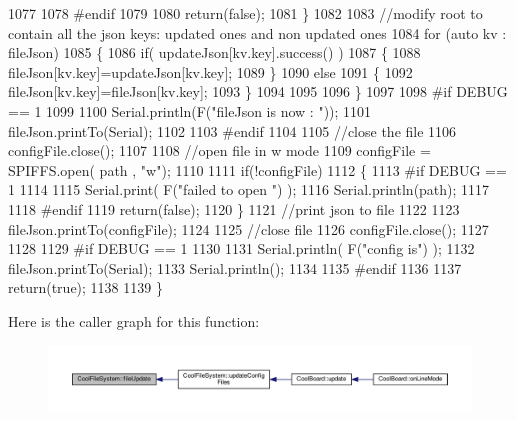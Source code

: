 \begin{DoxyCode}
1077 
1078 \textcolor{preprocessor}{    #endif}
1079 
1080         \textcolor{keywordflow}{return}(\textcolor{keyword}{false});
1081     \}
1082     
1083     \textcolor{comment}{//modify root to contain all the json keys: updated ones and non updated ones}
1084     \textcolor{keywordflow}{for} (\textcolor{keyword}{auto} kv : fileJson) 
1085     \{
1086         \textcolor{keywordflow}{if}( updateJson[kv.key].success() )
1087         \{
1088             fileJson[kv.key]=updateJson[kv.key];            
1089         \}
1090         \textcolor{keywordflow}{else}
1091         \{
1092             fileJson[kv.key]=fileJson[kv.key];
1093         \}
1094 
1095                 
1096     \}
1097 
1098 \textcolor{preprocessor}{#if DEBUG == 1}
1099 
1100     Serial.println(F(\textcolor{stringliteral}{"fileJson is now : "}));
1101     fileJson.printTo(Serial);
1102 
1103 \textcolor{preprocessor}{#endif}
1104 
1105     \textcolor{comment}{//close the file}
1106     configFile.close();
1107 
1108     \textcolor{comment}{//open file in w mode}
1109     configFile = SPIFFS.open( path , \textcolor{stringliteral}{"w"});
1110     
1111     \textcolor{keywordflow}{if}(!configFile)
1112     \{   
1113 \textcolor{preprocessor}{    #if DEBUG == 1}
1114         
1115         Serial.print( F(\textcolor{stringliteral}{"failed to open "}) );
1116         Serial.println(path);
1117 
1118 \textcolor{preprocessor}{    #endif}
1119         \textcolor{keywordflow}{return}(\textcolor{keyword}{false});
1120     \}
1121     \textcolor{comment}{//print json to file    }
1122     
1123     fileJson.printTo(configFile);
1124     
1125     \textcolor{comment}{//close file}
1126     configFile.close();
1127 
1128 
1129 \textcolor{preprocessor}{#if DEBUG == 1}
1130 
1131     Serial.println( F(\textcolor{stringliteral}{"config is"}) );
1132     fileJson.printTo(Serial);
1133     Serial.println();
1134 
1135 \textcolor{preprocessor}{#endif}
1136     
1137     \textcolor{keywordflow}{return}(\textcolor{keyword}{true});
1138     
1139 \}
\end{DoxyCode}
Here is the caller graph for this function\+:\nopagebreak
\begin{figure}[H]
\begin{center}
\leavevmode
\includegraphics[width=350pt]{db/d0c/class_cool_file_system_a13f2958f5b87757c31fc53797a30d23a_icgraph}
\end{center}
\end{figure}
\mbox{\label{class_cool_file_system_a70701d05e811604af1b531f4f6dc69ed}} 
